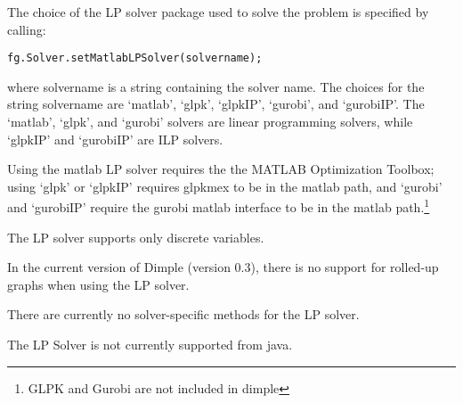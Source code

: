 The choice of the LP solver package used to solve the problem is specified by calling:
\begin{lstlisting}
fg.Solver.setMatlabLPSolver(solvername);
\end{lstlisting}
where solvername is a string containing the solver name. The choices for the string solvername are `matlab', `glpk', `glpkIP', `gurobi', and `gurobiIP'. The `matlab', `glpk', and `gurobi' solvers are linear programming solvers, while `glpkIP' and `gurobiIP' are ILP solvers.

Using the matlab LP solver requires the the MATLAB Optimization Toolbox; using `glpk' or `glpkIP' requires glpkmex to be in the matlab path, and `gurobi' and `gurobiIP' require the gurobi matlab interface to be in the matlab path.\footnote{GLPK and Gurobi are not included in dimple}

The LP solver supports only discrete variables.

In the current version of Dimple (version 0.3), there is no support for rolled-up graphs when using the LP solver.

There are currently no solver-specific methods for the LP solver.

\fi

\ifjava
The LP Solver is not currently supported from java.
\fi
